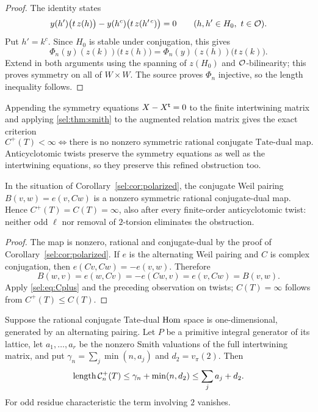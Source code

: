 \begin{proof}
The identity  states
\[
 y(h')\bigl(t\,z(h)\bigr)-y(h^c)\bigl(t\,z(h'^{\,c})\bigr)=0
 \qquad(h,h'\in H_0,\ t\in\mathcal{O}).
\]
Put $h'=k^c$. Since $H_0$ is stable under conjugation, this gives
\[
 \Phi_n(y)(z(k))\bigl(t\,z(h)\bigr)=\Phi_n(y)(z(h))\bigl(t\,z(k)\bigr).
\]
Extend in both arguments using the spanning of $z(H_0)$ and
$\mathcal{O}$-bilinearity; this proves symmetry on all of $W\times W$. The source
proves $\Phi_n$ injective, so the length inequality follows.
\end{proof}

Appending the symmetry equations $X-X^{\mathsf{t}}=0$ to the finite intertwining
matrix and applying \cref{sel:thm:smith} to the augmented relation matrix
gives the exact criterion
\begin{equation}\label{sel:eq:Cplus}
 C^+(T)<\infty\iff
 \text{there is no nonzero symmetric rational conjugate Tate-dual map.}
\end{equation}
Anticyclotomic twists preserve the symmetry equations as well as the
intertwining equations, so they preserve this refined obstruction too.

\begin{proposition}\label{sel:prop:weilsign}
In the situation of Corollary~\ref{sel:cor:polarized}, the conjugate Weil
pairing $B(v,w)=e(v,Cw)$ is a nonzero symmetric rational conjugate-dual map.
Hence $C^+(T)=C(T)=\infty$, also after every finite-order anticyclotomic
twist: neither odd $\ell$ nor removal of $2$-torsion eliminates the
obstruction.
\end{proposition}

\begin{proof}
The map is nonzero, rational and conjugate-dual by the proof of
Corollary~\ref{sel:cor:polarized}. If $e$ is the alternating Weil pairing and
$C$ is complex conjugation, then $e(Cv,Cw)=-e(v,w)$. Therefore
\[
 B(w,v)=e(w,Cv)=-e(Cw,v)=e(v,Cw)=B(v,w).
\]
Apply \eqref{sel:eq:Cplus} and the preceding observation on twists; $C(T)=\infty$
follows from $C^+(T)\le C(T)$.
\end{proof}

\begin{proposition}\label{sel:prop:opposite}
Suppose the rational conjugate Tate-dual $\operatorname{Hom}$ space is one-dimensional,
generated by an alternating pairing. Let $P$ be a primitive integral
generator of its lattice, let $a_1,\dots,a_r$ be the nonzero Smith
valuations of the full intertwining matrix, and put
$\gamma_n=\sum_j\min(n,a_j)$ and $d_2=v_\pi(2)$. Then
\[
 \operatorname{length}\mathcal C_n^+(T)\le\gamma_n+\min(n,d_2)\le\sum_ja_j+d_2 .
\]
For odd residue characteristic the term involving $2$ vanishes.
\end{proposition}

